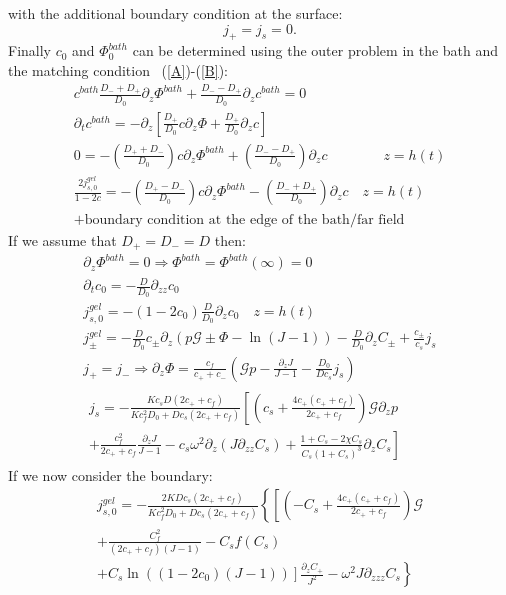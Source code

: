 \documentclass[12pt]{extarticle}
\begin{document}
with the additional boundary condition at the surface:
\begin{equation}
j_+= j_s = 0.
\end{equation}
Finally $c_0$ and $\Phi^{bath}_0$ can be determined using the outer problem in the bath and the matching condition ~(\ref{A})-(\ref{B}):
\begin{gather}
c^{bath} \frac{D_-+D_+}{D_0} \partial_z \Phi^{bath} + \frac{D_--D_+}{D_0} \partial_z c^{bath}=0\\
\partial_t c^{bath} = -\partial_z\left[\frac{D_+}{D_0} c \partial_z \Phi +\frac{D_+}{D_0} \partial_z c\right]\\
0= - \left(\frac{D_++D_-}{D_0}\right)c\partial_z \Phi^{bath} + \left(\frac{D_--D_+}{D_0}\right)\partial_z c \qquad \qquad z=h(t)\\
\frac{2j_{s,0}^{gel}}{1-2c} =- \left(\frac{D_+-D_-}{D_0}\right)c\partial_z \Phi^{bath} - \left(\frac{D_-+D_+}{D_0}\right)\partial_z c \quad z=h(t)\\
+ \text{boundary condition at the edge of the bath/far field}
\end{gather}
If we assume that $D_+=D_-=D$ then:
\begin{gather}
\partial_z \Phi^{bath}=0 \Rightarrow \Phi^{bath}=\Phi^{bath}(\infty)=0\\
\partial_t c_0 = -\frac{D}{D_0} \partial_{zz}c_0\\
j_{s,0}^{gel}=-(1-2c_0)\frac{D}{D_0} \partial_z c_0 \quad z=h(t)\\
j_{\pm}^{gel}=-\frac{D}{D_0}c_\pm \partial_z\left(p\mathcal{G}\pm\Phi-\ln(J-1)\right)-\frac{D}{D_0}\partial_z C_\pm+\frac{c_\pm}{c_s}j_s\\ 
j_+=j_- \Rightarrow  \partial_z \Phi = \frac{c_f}{c_++c_-} \left(\mathcal{G}p-\frac{\partial_z J}{J-1}-\frac{D_0}{Dc_s}j_s\right)\\
\begin{aligned}
j_s = - \frac{Kc_s D(2c_++c_f)}{Kc_f^2D_0+Dc_s(2c_++c_f)}\left[\left(c_s+\frac{4c_+(c_++c_f)}{2c_++c_f}\right)\mathcal{G}\partial_z p\right.\\
\left.+\frac{c_f^2}{2c_++c_f}\frac{\partial_z J}{J-1}-c_s \omega^2 \partial_z(J\partial_{zz}C_s)+\frac{1+C_s-2\chi C_s}{C_s(1+C_s)^3}\partial_z C_s\right]
\end{aligned}
\end{gather}
If we now consider the boundary:
\begin{equation}
\begin{aligned}
j^{gel}_{s,0} = - \frac{2K Dc_s(2c_++c_f)}{Kc_f^2D_0+Dc_s(2c_++c_f)}\left\{\left[\left(-C_s+\frac{4c_+(c_++c_f)}{2c_++c_f}\right)\mathcal{G}\right.\right.\\
\left.\left.+\frac{C_f^2}{(2c_++c_f)(J-1)}-C_sf(C_s)\right.\right.\\
\left.\left.+C_ s\ln\left((1-2c_0)(J-1)\right)\right]\frac{\partial_z C_+}{J^2}-\omega^2J\partial_{zzz}C_s\right\}
\end{aligned}
\end{equation}
\end{document}
